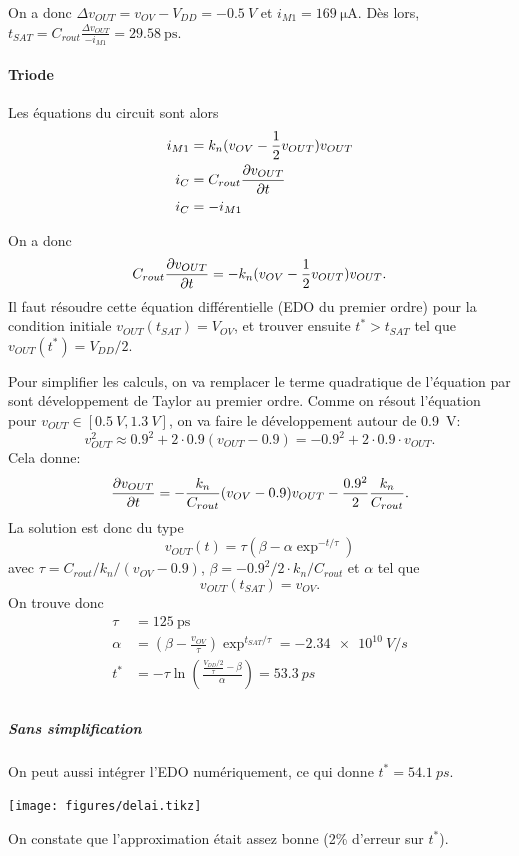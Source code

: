 \documentclass[frenchb,DIV=14]{scrartcl}
\begin{document}
On a donc $\Delta v_{OUT} = v_{OV} - V_{DD} = \SI{-0.5}{V}$ et
$i_{M1} = \SI{169}{\micro\ampere}$.
Dès lors, $t_{SAT} = C_{rout}\frac{\Delta v_{OUT}}{-i_{M1}} = \SI{29.58}{\pico\second}$.

\paragraph{Triode}

Les équations du circuit sont alors
\begin{align*}
    i_{M1} &= k_n (v_{OV} - \frac{1}{2}v_{OUT})v_{OUT} \\
    i_C &= C_{rout}\frac{\partial v_{OUT}}{\partial t} \\
    i_C &= -i_{M1} \\
\end{align*}

On a donc
\[C_{rout}\frac{\partial v_{OUT}}{\partial t} = - k_n (v_{OV} - \frac{1}{2}v_{OUT})v_{OUT}.\]
Il faut résoudre cette équation différentielle (EDO du premier ordre) pour
la condition initiale $v_{OUT}(t_{SAT}) = V_{OV}$, et trouver ensuite
$t^* > t_{SAT}$ tel que $v_{OUT}(t^*) = V_{DD}/2$.

Pour simplifier les calculs, on va remplacer le terme quadratique
de l'équation par sont développement de Taylor au premier ordre.
Comme on résout l'équation pour $v_{OUT}\in [\SI{0.5}{V}, \SI{1.3}{V}]$,
on va faire le développement autour de \SI{0.9}{V}:
\[v_{OUT}^2 \approx 0.9^2 + 2\cdot 0.9(v_{OUT}-0.9)
= -0.9^2 + 2\cdot 0.9\cdot v_{OUT}.\]
Cela donne:
\[\frac{\partial v_{OUT}}{\partial t} = - \frac{k_n}{C_{rout}} (v_{OV}-0.9) v_{OUT} - \frac{0.9^2}{2}\frac{k_n}{C_{rout}}.\]
La solution est donc du type
\[v_{OUT}(t) = \tau\left(\beta - \alpha\exp^{-t/\tau}\right)\]
avec $\tau = C_{rout} / k_n / (v_{OV}-0.9)$, $\beta = -0.9^2/2\cdot k_n/C_{rout}$ et $\alpha$ tel que
\[v_{OUT}(t_{SAT}) =  v_{OV}.\]
On trouve donc
\begin{align*}
    \tau &= \SI{125}{\pico\second} \\
    \alpha &= \left(\beta-\frac{v_{OV}}{\tau}\right)\exp^{t_{SAT}/\tau} = \SI{-2.34e10}{V/s} \\
    t^* &= -\tau\ln\left(\frac{\frac{V_{DD}/2}{\tau}-\beta}{\alpha}\right) = \SI{53.3}{ps} \\
\end{align*}

\subparagraph{Sans simplification} On peut aussi intégrer l'EDO numériquement,
ce qui donne $t^* = \SI{54.1}{ps}$.
\begin{center}
    \texttt{[image: figures/delai.tikz]}
\end{center}
On constate que l'approximation était assez bonne (2\% d'erreur sur $t^*$).
\end{document}
